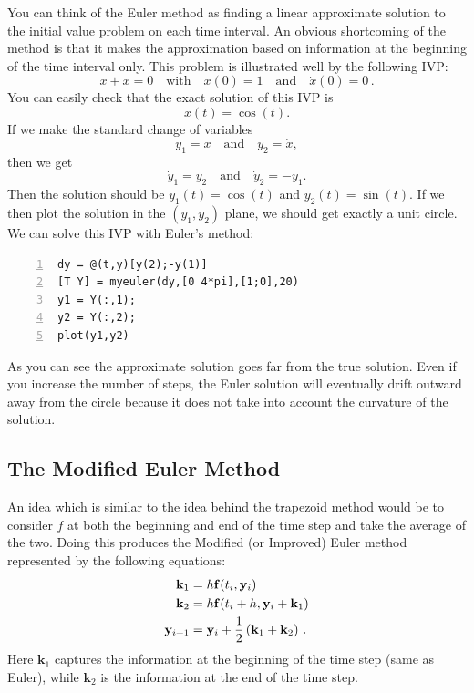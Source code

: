 You can think of the Euler method as finding a linear approximate
solution to the initial value problem on each time interval.
An obvious shortcoming of the method is that it makes the
approximation based on information at the beginning of the
time interval only. This problem is illustrated well by the
following IVP:
\begin{equation}
   \ddot{x} + x = 0\quad\text{with}\quad 
   x(0)=1\quad\text{and}\quad \dot{x}(0) = 0
\,.
\end{equation}
You can easily check that the exact solution of this IVP is
$$
    x(t) = \cos(t).
$$
If we make the standard change of variables
$$
      y_1 = x \quad\text{and}\quad y_2 = \dot{x},
$$
then we get
$$
       \dot{y}_1 = y_2 \quad\text{and}\quad \dot{y}_2 = - y_1.
$$
Then the solution should be $y_1(t) = \cos(t)$ and $y_2(t) = \sin(t)$.
If we then plot the solution in the $(y_1,y_2)$ plane, we should
get exactly a unit circle. We can solve this IVP with Euler's method:
\begin{lstlisting}[frame=none,numbers=left]
dy = @(t,y)[y(2);-y(1)]
[T Y] = myeuler(dy,[0 4*pi],[1;0],20)
y1 = Y(:,1);
y2 = Y(:,2);
plot(y1,y2)
\end{lstlisting}
As you can see the approximate solution goes far from the true solution.
Even if you increase the number of steps, the Euler solution will
eventually drift outward away from the circle because it does not
take into account the curvature of the solution.


\subsection*{The Modified Euler Method}

An idea which is similar to the idea behind the trapezoid method
would be to consider $f$ at both the beginning and end of the
time step and take the average of the two. Doing this produces
the Modified (or Improved) Euler method represented by the following
equations:
\begin{equation}
\begin{split}
\mathbf{k}_1 &= h \mathbf{f}(t_i,\mathbf{y}_i)\\
\mathbf{k}_2 &= h \mathbf{f}(t_i+h, \mathbf{y}_i + \mathbf{k}_1)\\
\mathbf{y}_{i+1} &= \mathbf{y}_i +  \frac{1}{2} \left(\mathbf{k}_1 + \mathbf{k}_2 \right)
\,.
\end{split}
\end{equation}
Here $\mathbf{k}_1$ captures the information at the beginning of the
time step (same as Euler), while $\mathbf{k}_2$ is the information at
the end of the time step.

